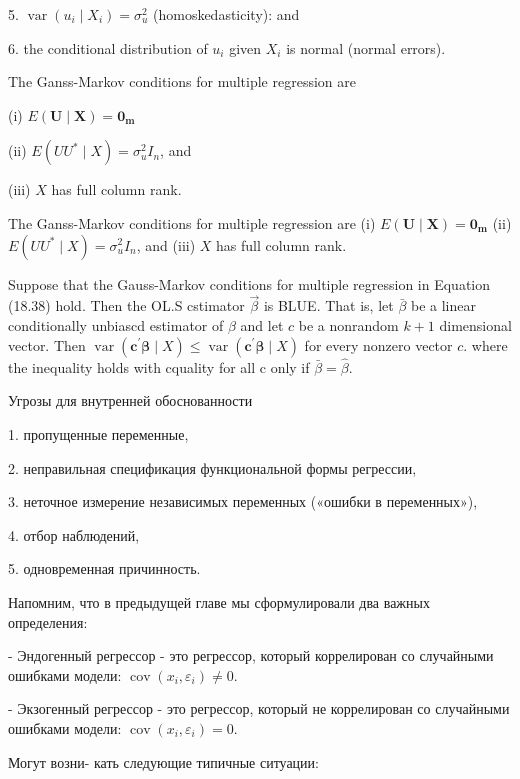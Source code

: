 \documentclass[a4paper,8pt]{article} %
\begin{document}
5. $\operatorname{var}\left(u_{i} \mid X_{i}\right)=\sigma_{u}^{2}$ (homoskedasticity): and

6. the conditional distribution of $u_{i}$ given $X_{i}$ is normal (normal errors).


The Ganss-Markov conditions for multiple regression are

(i) $E(\boldsymbol{U} \mid \boldsymbol{X})=\boldsymbol{0}_{\boldsymbol{m}}$

(ii) $E\left(U U^{*} \mid X\right)=\sigma_{u}^{2} I_{n}$, and

(iii) $X$ has full column rank.

The Ganss-Markov conditions for multiple regression are
(i) $E(\boldsymbol{U} \mid \boldsymbol{X})=\boldsymbol{0}_{\boldsymbol{m}}$
(ii) $E\left(U U^{*} \mid X\right)=\sigma_{u}^{2} I_{n}$, and
(iii) $X$ has full column rank.

Suppose that the Gauss-Markov conditions for multiple regression in Equation (18.38) hold. Then the OL.S cstimator $\vec{\beta}$ is BLUE. That is, let $\bar{\beta}$ be a linear conditionally unbiascd estimator of $\beta$ and let $c$ be a nonrandom $k+1$ dimensional vector. Then $\operatorname{var}\left(\boldsymbol{c}^{\prime} \boldsymbol{\beta} \mid X\right) \leq \operatorname{var}\left(\boldsymbol{c}^{\prime} \boldsymbol{\beta} \mid X\right)$ for every nonzero vector $c$. where the
inequality holds with cquality for all c only if $\bar{\beta}=\hat{\beta}$.




Угрозы для внутренней
обоснованности

1. пропущенные переменные,

2. неправильная спецификация функциональной формы регрессии,

3. неточное измерение независимых переменных («ошибки в переменных»),

4. отбор наблюдений,

5. одновременная причинность.

Напомним, что в предыдущей главе мы сформулировали два важных определения:

- Эндогенный регрессор - это регрессор, который коррелирован со случайными ошибками модели: $\operatorname{cov}\left(x_{i}, \varepsilon_{i}\right) \neq 0 .$

- Экзогенный регрессор - это регрессор, который не коррелирован со случайными ошибками модели: $\operatorname{cov}\left(x_{i}, \varepsilon_{i}\right)=0 .$

Могут возни-
кать следующие типичные ситуации:
\end{document}

